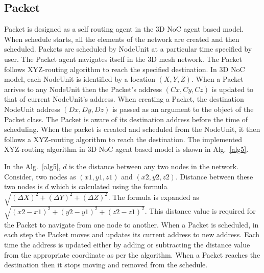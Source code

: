 \subsection{Packet}
\vspace{5mm}

Packet is designed as a self routing agent in the 3D NoC agent based model. When schedule starts, all the elements of the network are created and then scheduled. Packets are scheduled by NodeUnit at a particular time specified by user. The Packet agent navigates itself in the 3D mesh network. The Packet follows XYZ-routing algorithm to reach the specified destination. In 3D NoC model, each NodeUnit is identified by a location $(X, Y, Z)$. When a Packet arrives to any NodeUnit then the Packet's address $(Cx, Cy, Cz)$ is updated to that of current NodeUnit's address. When creating a Packet, the destination NodeUnit address $(Dx, Dy, Dz)$ is passed as an argument to the object of the Packet class. The Packet is aware of its destination address before the time of scheduling. When the packet is created and scheduled from the NodeUnit, it then follows a XYZ-routing algorithm to reach the destination. The implemented XYZ-routing algorithm in 3D NoC agent based model is shown in Alg.~\ref{alg5}.


In the Alg.~\ref{alg5}, $d$ is the distance between any two nodes in the network. Consider, two nodes as $(x1, y1, z1)$ and $(x2, y2, z2)$. Distance between these two nodes is $d$ which is calculated using the formula $\sqrt{(\Delta X)^2+(\Delta Y)^2+(\Delta Z)^2}$. The formula is expanded as $\sqrt{(x2-x1)^{2}+(y2-y1)^{2}+(z2-z1)^{2}}$. This distance value is required for the Packet to navigate from one node to another. When a Packet is scheduled, in each step the Packet moves and updates its current address to new address. Each time the address is updated either by adding or subtracting the distance value from the appropriate coordinate as per the algorithm. When a Packet reaches the destination then it stops moving and removed from the schedule. 

